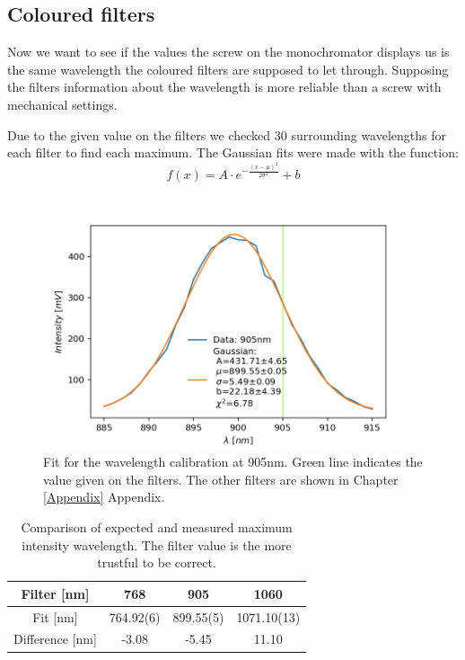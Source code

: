\documentclass[]{article}
\begin{document}
\subsection{Coloured filters} \label{color filters}
Now we want to see if the values the screw on the monochromator displays us is the same wavelength the coloured filters are supposed to let through. Supposing the filters information about the wavelength is more reliable than a screw with mechanical settings.

Due to the given value on the filters we checked 30 surrounding wavelengths for each filter to find each maximum. The Gaussian fits were made with the function:
\begin{equation}
f(x) = A \cdot e^{-\frac{(x-\mu)^2}{2 \sigma^2}} + b
\end{equation}

\begin{figure}[H]
\centering
\includegraphics[width=.9\textwidth]{Plots/905nm-Filter.png}
\caption{Fit for the wavelength calibration at 905nm. Green line indicates the value given on the filters. The other filters are shown in Chapter \ref{Appendix} Appendix.}
\end{figure}

\begin{table}[H]
	\centering
	\begin{tabular}{c|c|c|c}
	Filter [nm] & 768 & 905 & 1060 \\ \hline
	Fit [nm] & 764.92(6) & 899.55(5) & 1071.10(13) \\ \hline
	Difference [nm] & -3.08 & -5.45 & 11.10
	\end{tabular}
	\caption{Comparison of expected and measured maximum intensity wavelength. The filter value is the more trustful to be correct.}
\end{table}
\end{document}
